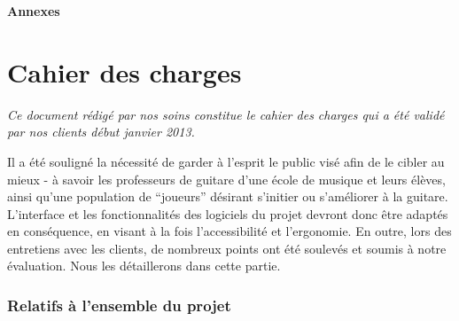 \documentclass[a4paper,11pt]{article}
\begin{document}
\clearpage





















\begin{titlepage}
  \begin{center}
    \vspace{8cm}
    \Huge \textbf{Annexes}
  \end{center}
\end{titlepage}

\clearpage

\section*{Cahier des charges}\label{cdc}

\textit{Ce document rédigé par nos soins constitue le cahier des charges qui a été validé par nos clients début janvier 2013.}

\vspace{1cm}

Il a été souligné la nécessité de garder à l'esprit le public visé afin de le cibler au mieux - à savoir les professeurs de guitare d'une école de musique et leurs élèves, ainsi qu'une population de ``joueurs'' désirant s'initier ou s'améliorer à la guitare. L'interface et les fonctionnalités des logiciels du projet devront donc être adaptés en conséquence, en visant à la fois l'accessibilité et l'ergonomie. En outre, lors des entretiens avec les clients, de nombreux points ont été soulevés et soumis à notre évaluation. Nous les détaillerons dans cette partie.

\subsubsection*{Relatifs à l'ensemble du projet}
\end{document}
